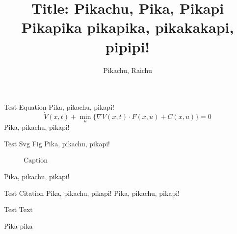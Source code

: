 \documentclass{beamer}
\title{Title: Pikachu, Pika, Pikapi Pikapika pikapika, pikakakapi, pipipi!}
\author{Pikachu, Raichu \texorpdfstring{\Envelope}{}}
\institute{Pikachu Valley}
\begin{document}
\begin{frame}[t] 
\centering
    \begin{minipage}[t][0.93\textheight][t]{0.31\textwidth}
    
        \begin{block}{Test Equation}
        Pika, pikachu, pikapi!
        \begin{equation}
            \dot{V}(x, t)+\min _{u}\{\nabla V(x, t) \cdot F(x, u)+C(x, u)\}=0
        \end{equation}
        Pika, pikachu, pikapi!
        \end{block}
        
        \begin{block}{Test Svg Fig}
        Pika, pikachu, pikapi!
        \begin{figure}[h]
            \centering
            
            \caption{Caption}
            \label{fig:my_label}
        \end{figure}
        Pika, pikachu, pikapi!
        \end{block}
        
        \begin{block}{Test Citation}
        Pika, pikachu, pikapi! \cite{aaa}
        Pika, pikachu, pikapi! \cite{bbb}
        \end{block}
        
        \begin{block}{Test Text}
        \lipsum[1]
        \end{block}
        
    \end{minipage}
    \hspace{0.03\linewidth}
    \begin{minipage}[t][0.93\textheight][t]{0.31\textwidth}
    
        \begin{block}{Pika pika}
        \lipsum[1-2]
        \end{block}
        

\end{minipage}
\end{frame}
\end{document}
